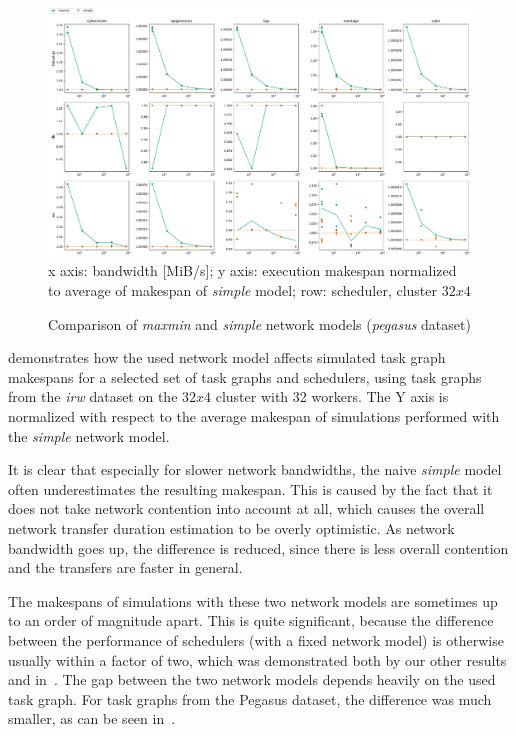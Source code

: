 \begin{figure}
	\centering
	\includegraphics[width=\textwidth]{imgs/estee/charts/pegasus-32x4-netmodel-score}
	\\ {\small x axis: bandwidth [MiB/s]; y axis: execution makespan normalized
	to average of makespan of \emph{simple} model; row: scheduler, cluster
	$32x4$} \caption{Comparison of \emph{maxmin} and \emph{simple} network models
	(\emph{pegasus} dataset)} \label{fig:estee-chart-pegasus-netmodel}
\end{figure}

 demonstrates how the used network model affects simulated task
graph makespans for a selected set of task graphs and schedulers, using task graphs from the
\emph{irw} dataset on the $32x4$ cluster with 32 workers. The Y axis
is normalized with respect to the average makespan of simulations performed with the
\emph{simple} network model.

It is clear that especially for slower network bandwidths, the naive \emph{simple} model
often underestimates the resulting makespan. This is caused by the fact that it does not take
network contention into account at all, which causes the overall network transfer duration
estimation to be overly optimistic. As network bandwidth goes up, the difference is reduced, since
there is less overall contention and the transfers are faster in general.

The makespans of simulations with these two network models are sometimes up to an order of
magnitude apart. This is quite significant, because the difference between the performance of
schedulers (with a fixed network model) is otherwise usually within a factor of two, which was
demonstrated both by our other results and in~\cite{wang2018list}. The gap between the two
network models depends heavily on the used task graph. For task graphs from the Pegasus dataset,
the difference was much smaller, as can be seen in~.

